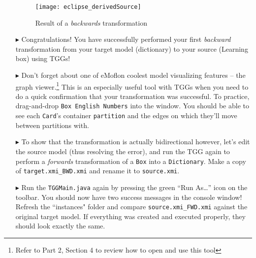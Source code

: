 \begin{itemize}
\vspace{0.5cm}

\begin{figure}[htbp]
\begin{center}
  \texttt{[image: eclipse\_derivedSource]}
  \caption{Result of a \emph{backwards} transformation}
  \label{fig:derivedBOX}
\end{center}
\end{figure}

\item[$\blacktriangleright$] Congratulations! You have successfully performed your first \emph{backward} transformation from your target model (dictionary) to
your source (Learning box) using TGGs! 

\newpage

\item[$\blacktriangleright$] Don't forget about one of eMoflon coolest model visualizing features -- the graph viewer.\footnote{Refer to Part 2, Section 4 to
review how to open and use this tool} This is an especially useful tool with TGGs when you need to do a quick confirmation that your transformation was
successful. To practice, drag-and-drop \texttt{Box English Numbers} into the window. You should be able to see each \texttt{Card}'s container
\texttt{partition} and the edges on which they'll move between partitions with. 


\item[$\blacktriangleright$] To show that the transformation is actually bidirectional however, let's edit the source model (thus resolving the error), and run
the TGG again to perform a \emph{forwards} transformation of a \texttt{Box} into a \texttt{Dictionary}. Make a copy of \texttt{target.xmi\_BWD.xmi} and rename
it to \texttt{source.xmi}.

\item[$\blacktriangleright$] Run the \texttt{TGGMain.java} again by pressing the green ``Run As\ldots'' icon on the toolbar. You should now have two success
messages in the console window! Refresh the ``instances" folder and compare \texttt{source.xmi\_FWD.xmi} against the original target model. If everything was
created and executed properly, they should look exactly the same. 

\end{itemize}
